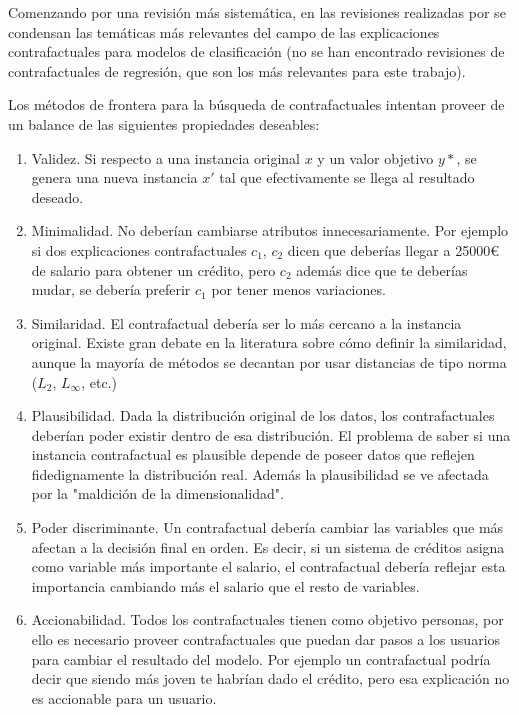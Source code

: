 \documentclass[12pt]{report} %
\begin{document}
Comenzando por una revisión más sistemática, en las revisiones realizadas por \cite{Guidotti2022, Kan2024, Artelt2019, Verma2024, Chou2022} se condensan las temáticas más relevantes del campo de las explicaciones contrafactuales para modelos de clasificación (no se han encontrado revisiones de contrafactuales de regresión, que son los más relevantes para este trabajo).

Los métodos de frontera para la búsqueda de contrafactuales intentan proveer de un balance de las siguientes propiedades deseables:
\begin{enumerate}
    \item Validez. Si respecto a una instancia original $x$ y un valor objetivo $y*$, se genera una nueva instancia $x'$ tal que efectivamente se llega al resultado deseado.
    \item Minimalidad. No deberían cambiarse atributos innecesariamente. Por ejemplo si dos explicaciones contrafactuales $c_1$, $c_2$ dicen que deberías llegar a 25000€ de salario para obtener un crédito, pero $c_2$ además dice que te deberías mudar, se debería preferir $c_1$ por tener menos variaciones.
    \item Similaridad. El contrafactual debería ser lo más cercano a la instancia original. Existe gran debate en la literatura sobre cómo definir la similaridad, aunque la mayoría de métodos se decantan por usar distancias de tipo norma ($L_2$, $L_{\infty}$, etc.)
    \item Plausibilidad. Dada la distribución original de los datos, los contrafactuales deberían poder existir dentro de esa distribución. El problema de saber si una instancia contrafactual es plausible depende de poseer datos que reflejen fidedignamente la distribución real. Además la plausibilidad se ve afectada por la "maldición de la dimensionalidad".
    \item Poder discriminante. Un contrafactual debería cambiar las variables que más afectan a la decisión final en orden. Es decir, si un sistema de créditos asigna como variable más importante el salario, el contrafactual debería reflejar esta importancia cambiando más el salario que el resto de variables.
    \item Accionabilidad. Todos los contrafactuales tienen como objetivo personas, por ello es necesario proveer contrafactuales que puedan dar pasos a los usuarios para cambiar el resultado del modelo. Por ejemplo un contrafactual podría decir que siendo más joven te habrían dado el crédito, pero esa explicación no es accionable para un usuario.

\end{enumerate}
\end{document}
